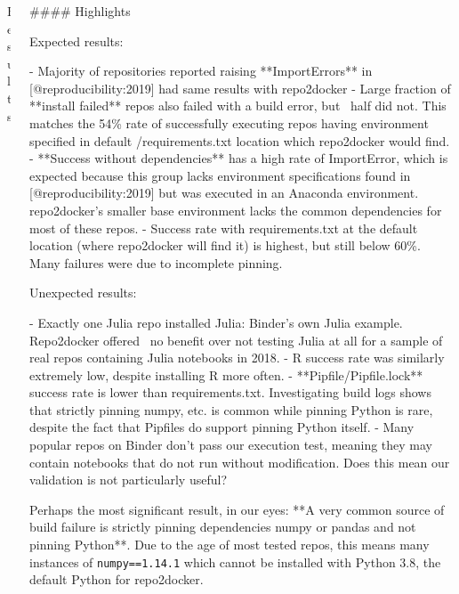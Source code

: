 \documentclass{beamer}
\begin{document}
\begin{frame}[fragile]
\begin{columns}[T]
\begin{column}{.4\textwidth}
\begin{block}{Results}
\end{block}

\begin{markdown}


\end{markdown}


\end{column}

\begin{column}{.3\textwidth}
\begin{markdown}

#### Highlights

Expected results:

- Majority of repositories reported raising **ImportErrors** in [@reproducibility:2019] had same results with repo2docker
- Large fraction of **install failed** repos also failed with a build error, but ~half did not.
  This matches the 54\% rate of successfully executing repos having environment specified in default /requirements.txt location which repo2docker would find.
- **Success without dependencies** has a high rate of ImportError,
  which is expected because this group lacks environment specifications
  found in [@reproducibility:2019] but was executed in an Anaconda environment.
  repo2docker's smaller base environment lacks the common dependencies for most of these repos.
- Success rate with requirements.txt at the default location (where repo2docker will find it) is highest, but still below 60\%.
  Many failures were due to incomplete pinning.



Unexpected results:

- Exactly one Julia repo installed Julia: Binder's own Julia example.
  Repo2docker offered ~no benefit over not testing Julia at all
  for a sample of real repos containing Julia notebooks in 2018.
- R success rate was similarly extremely low, despite installing R more often.
- **Pipfile/Pipfile.lock** success rate is lower than requirements.txt.
  Investigating build logs shows that strictly pinning numpy, etc. is common
  while pinning Python is rare, despite the fact that Pipfiles do support pinning Python itself.
- Many popular repos on Binder don't pass our execution test,
  meaning they may contain notebooks that do not run without modification.
  Does this mean our validation is not particularly useful?

Perhaps the most significant result, in our eyes: **A very common source of build failure is strictly pinning dependencies numpy or pandas and not pinning Python**. Due to the age of most tested repos,
  this means many instances of \texttt{numpy==1.14.1} which cannot be installed
  with Python 3.8, the default Python for repo2docker.



\end{markdown}
\end{column}
\end{columns}
\end{frame}
\end{document}

